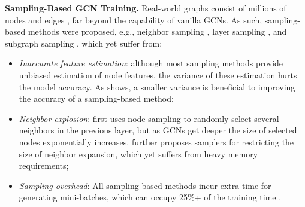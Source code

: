 \documentclass{article}
\newcommand{\niparagraph}[1]{\noindent\textbf{#1}}
\begin{document}
\niparagraph{Sampling-Based GCN Training.}
Real-world graphs consist of millions of nodes and 
edges \citep{hu2020open}, far beyond the capability of vanilla GCNs. 
As such, sampling-based methods were proposed, e.g., neighbor sampling \citep{hamilton2017inductive,chen2018stochastic}, layer sampling \citep{chen2018fastgcn,huang2018adaptive,zou2019layer}, and subgraph sampling \citep{chiang2019cluster,zeng2019graphsaint}, which yet suffer from:
\begin{itemize}
\item \textit{Inaccurate feature estimation}: although most sampling methods provide unbiased estimation of node features, the variance of these estimation hurts the model accuracy. As \citep{cong2020minimal} shows, a smaller variance is beneficial to improving the accuracy of a sampling-based method;
\item \textit{Neighbor explosion}: \citet{hamilton2017inductive} first uses node sampling to randomly select several neighbors in the previous layer, but as GCNs get deeper the size of selected nodes exponentially increases. \citet{chen2018stochastic} further proposes samplers for restricting the size of neighbor expansion, which yet suffers from heavy memory requirements;
\item \textit{Sampling overhead}: All sampling-based methods incur extra time for generating mini-batches, which can occupy 25\%+ of the training time \citep{zeng2019graphsaint}.
\end{itemize}
\end{document}
